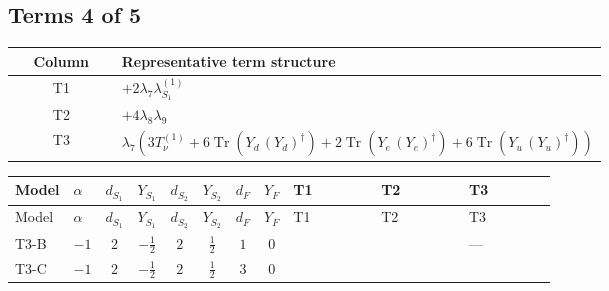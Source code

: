 \documentclass[8pt]{article}
\begin{document}
\begin{landscape}
\subsection*{Terms 4 of 5}
\begin{center}
\begin{tabular}{@{}c >{\raggedright\arraybackslash}p{0.82\linewidth}@{}}
\toprule
Column & Representative term structure \\
\midrule
T1 & \(\displaystyle +2 {\lambda_{7}} {\lambda_{S_1}^{(1)}}\) \\
\midrule
T2 & \(\displaystyle +4 {\lambda_{8}} {\lambda_{9}}\) \\
\midrule
T3 & \(\displaystyle {\lambda_{7}} (3 T_{\nu}^{(1)}+6 \operatorname{Tr}\!\left({Y_d}\,\left({Y_d}\right)^{\dagger}\right)+2 \operatorname{Tr}\!\left({Y_e}\,\left({Y_e}\right)^{\dagger}\right)+6 \operatorname{Tr}\!\left({Y_u}\,\left({Y_u}\right)^{\dagger}\right))\) \\
\midrule
\bottomrule
\end{tabular}
\end{center}
\smallskip
\tiny
\begin{longtable}{@{}llcccccc >{\raggedright\arraybackslash}p{0.21\linewidth} >{\raggedright\arraybackslash}p{0.21\linewidth} >{\raggedright\arraybackslash}p{0.21\linewidth}@{}}
\toprule
Model & $\alpha$ & $d_{S_1}$ & $Y_{S_1}$ & $d_{S_2}$ & $Y_{S_2}$ & $d_F$ & $Y_F$ & T1 & T2 & T3 \\
\midrule
\endfirsthead
\toprule
Model & $\alpha$ & $d_{S_1}$ & $Y_{S_1}$ & $d_{S_2}$ & $Y_{S_2}$ & $d_F$ & $Y_F$ & T1 & T2 & T3 \\
\midrule
\endhead
T3-B & $-1$ & $2$ & $-\frac{1}{2}$ & $2$ & $\frac{1}{2}$ & $1$ & $0$ & \scriptsize\adjustbox{max width=\linewidth}{$\begin{gathered} +2 {\lambda_{7}} {\lambda_{S_1}^{(1)}}\end{gathered}$} & \scriptsize\adjustbox{max width=\linewidth}{$\begin{gathered} +4 {\lambda_{8}} {\lambda_{9}}\end{gathered}$} & --- \\
\midrule
T3-C & $-1$ & $2$ & $-\frac{1}{2}$ & $2$ & $\frac{1}{2}$ & $3$ & $0$ & \scriptsize\adjustbox{max width=\linewidth}{$\begin{gathered} +2 {\lambda_{7}} {\lambda_{S_1}^{(1)}}\end{gathered}$} & \scriptsize\adjustbox{max width=\linewidth}{$\begin{gathered} +4 {\lambda_{8}} {\lambda_{9}}\end{gathered}$} & \scriptsize\adjustbox{max width=\linewidth}{$\begin{gathered} {\lambda_{7}} (3 T_{\nu}^{(1)}+6 \operatorname{Tr}\!\left({Y_d}\,\left({Y_d}\right)^{\dagger}\right)+2 \operatorname{Tr}\!\left({Y_e}\,\left({Y_e}\right)^{\dagger}\right)+6 \operatorname{Tr}\!\left({Y_u}\,\left({Y_u}\right)^{\dagger}\right))\end{gathered}$} \\

\end{longtable}
\end{landscape}
\end{document}
